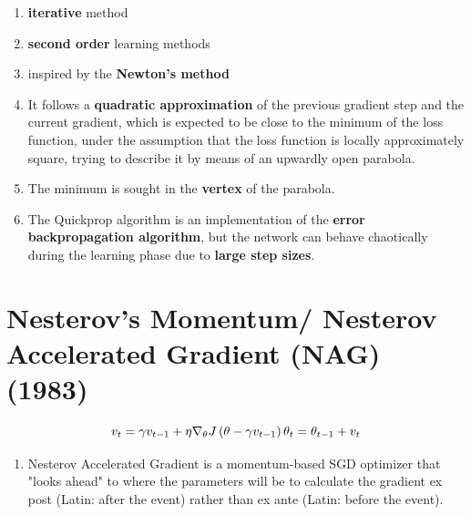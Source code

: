 \begin{enumerate}
    \item \textbf{iterative} method
    
    \item \textbf{second order} learning methods
    
    \item inspired by the \textbf{Newton's method}
    
    \item It follows a \textbf{quadratic approximation} of the previous gradient step and the current gradient, which is expected to be close to the minimum of the loss function, under the assumption that the loss function is locally approximately square, trying to describe it by means of an upwardly open parabola. 
    
    \item The minimum is sought in the \textbf{vertex} of the parabola.

    \item The Quickprop algorithm is an implementation of the \textbf{error backpropagation algorithm}, but the network can behave chaotically during the learning phase due to \textbf{large step sizes}.
\end{enumerate}






\section{Nesterov’s Momentum/ Nesterov Accelerated Gradient (NAG) (1983) \cite{paperswithcode/method/nesterov-accelerated-gradient}}\label{Nesterov’s Momentum/ Nesterov Accelerated Gradient (NAG)}

\[
    v_{t} = \gamma{v}_{t-1} + \eta\nabla_{\theta}J\left(\theta-\gamma{v_{t-1}}\right)
    \hfill
    \theta_{t} = \theta_{t-1} + v_{t}
\]

\begin{enumerate}
    \item Nesterov Accelerated Gradient is a momentum-based SGD optimizer that "looks ahead" to where the parameters will be to calculate the gradient ex post (Latin: after the event) rather than ex ante (Latin: before the event).

    
\end{enumerate}




